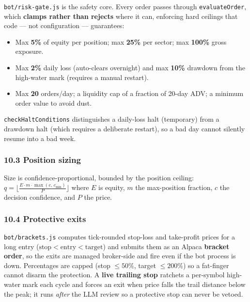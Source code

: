 \documentclass[
  11pt,
]{article}
\providecommand{\tightlist}{%
  \setlength{\itemsep}{0pt}\setlength{\parskip}{0pt}}
\begin{document}
\texttt{bot/risk-gate.js} is the safety core. Every order passes through
\texttt{evaluateOrder}, which \textbf{clamps rather than rejects} where
it can, enforcing hard ceilings that code --- not configuration ---
guarantees:

\begin{itemize}
\tightlist
\item
  Max \textbf{5\%} of equity per position; max \textbf{25\%} per sector;
  max \textbf{100\%} gross exposure.
\item
  Max \textbf{2\%} daily loss (auto-clears overnight) and max
  \textbf{10\%} drawdown from the high-water mark (requires a manual
  restart).
\item
  Max \textbf{20} orders/day; a liquidity cap of a fraction of 20-day
  ADV; a minimum order value to avoid dust.
\end{itemize}

\texttt{checkHaltConditions} distinguishes a daily-loss halt (temporary)
from a drawdown halt (which requires a deliberate restart), so a bad day
cannot silently resume into a bad week.

\subsubsection{10.3 Position sizing}\label{position-sizing}

Size is confidence-proportional, bounded by the position ceiling:
\(q = \big\lfloor \tfrac{E\cdot m\cdot \max(c,\,c_{\min})}{P} \big\rfloor\)
where \(E\) is equity, \(m\) the max-position fraction, \(c\) the
decision confidence, and \(P\) the price.

\subsubsection{10.4 Protective exits}\label{protective-exits}

\texttt{bot/brackets.js} computes tick-rounded stop-loss and take-profit
prices for a long entry (\(\text{stop} < \text{entry} < \text{target}\))
and submits them as an Alpaca \textbf{bracket order}, so the exits are
managed broker-side and fire even if the bot process is down.
Percentages are capped (stop \(\le 50\%\), target \(\le 200\%\)) so a
fat-finger cannot disarm the protection. A \textbf{live trailing stop}
ratchets a per-symbol high-water mark each cycle and forces an exit when
price falls the trail distance below the peak; it runs \emph{after} the
LLM review so a protective stop can never be vetoed.
\end{document}
